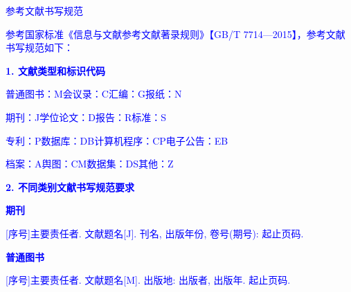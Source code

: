 \setlength{\baselineskip}{20pt}

\renewcommand{\thechapter}{参考文献}

\renewcommand*{\bibfont}{\zihao{5}}
\setlength{\bibitemsep}{0ex}
\setlength{\bibnamesep}{0ex}
\setlength{\bibinitsep}{0ex}
\renewcommand{\baselinestretch}{1.2}
\setlength{\biblabelsep}{0.5mm}
\renewcommand{\itemcmd}{
  \addvspace{\bibitemsep} %
  \mkgbnumlabel{\printfield{labelnumber}}
  \hspace{\biblabelsep}}

\textcolor{blue}{参考文献书写规范}

\textcolor{blue}{参考国家标准《信息与文献参考文献著录规则》【GB/T 7714—2015】，参考文献书写规范如下：}

\textcolor{blue}{\textbf{1. 文献类型和标识代码}}

\textcolor{blue}{普通图书：M}\qquad\textcolor{blue}{会议录：C}\qquad\textcolor{blue}{汇编：G}\qquad\textcolor{blue}{报纸：N}

\textcolor{blue}{期刊：J}\qquad\textcolor{blue}{学位论文：D}\qquad\textcolor{blue}{报告：R}\qquad\textcolor{blue}{标准：S}

\textcolor{blue}{专利：P}\qquad\textcolor{blue}{数据库：DB}\qquad\textcolor{blue}{计算机程序：CP}\qquad\textcolor{blue}{电子公告：EB}

\textcolor{blue}{档案：A}\qquad\textcolor{blue}{舆图：CM}\qquad\textcolor{blue}{数据集：DS}\qquad\textcolor{blue}{其他：Z}

\textcolor{blue}{\textbf{2. 不同类别文献书写规范要求}}

\textcolor{blue}{\textbf{期刊}}

\noindent\textcolor{blue}{[序号]主要责任者. 文献题名[J]. 刊名, 出版年份, 卷号(期号): 起止页码. }

\printbibliography [type=article,heading=none] 

\textcolor{blue}{\textbf{普通图书}}

\noindent\textcolor{blue}{[序号]主要责任者. 文献题名[M]. 出版地: 出版者, 出版年. 起止页码. }
\cite{Raymer1992Aircraft}

\printbibliography [keyword={book},heading=none] 

